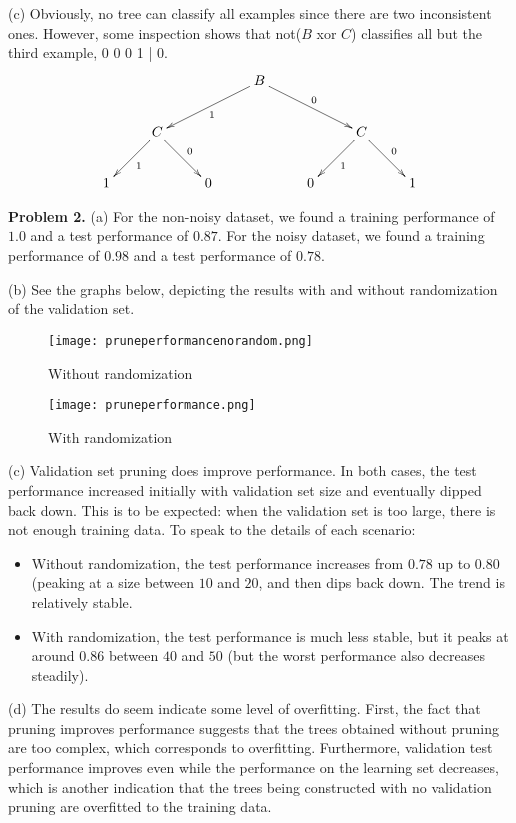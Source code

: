 \documentclass[12pt]{amsart}
\theoremstyle{remark}
\begin{document}
(c) Obviously, no tree can classify all examples since there are two inconsistent ones. However, some inspection shows that not($B$ xor $C$) classifies all but the third example, 0 0 0 1 | 0. 
\[
\xymatrix{
& & & \ar[dll]^1 \ar[drr]^0 B  & & & \\
& C \ar[dl]^1 \ar[dr]^0 & & & & C \ar[dl]^1 \ar[dr]^0 \\
1 & & 0 & & 0 &  & 1
}
\]

\newpage

\noindent \textbf{Problem 2.} (a) For the non-noisy dataset, we found a training performance of $1.0$ and a test performance of $0.87$. For the noisy dataset, we found a training performance of $0.98$ and a test performance of $0.78$. 

(b) See the graphs below, depicting the results with and without randomization of the validation set. 


\begin{figure}[!h]
\texttt{[image: pruneperformancenorandom.png]}
\caption{Without randomization}
\end{figure}

\begin{figure}[!h]
\texttt{[image: pruneperformance.png]}
\caption{With randomization}
\end{figure}



(c) Validation set pruning does improve performance. In both cases, the test performance increased initially with validation set size and eventually dipped back down. This is to be expected: when the validation set is too large, there is not enough training data. To speak to the details of each scenario:

\begin{itemize}
\item Without randomization, the test performance increases from $0.78$ up to $0.80$ (peaking at a size between $10$ and $20$, and then dips back down. The trend is relatively stable. 
\item With randomization, the test performance is much less stable, but it peaks at around $0.86$ between $40$ and $50$ (but the worst performance also decreases steadily). 
\end{itemize}

(d) The results do seem indicate some level of overfitting. First, the fact that pruning improves performance suggests that the trees obtained without pruning are too complex, which corresponds to overfitting. Furthermore, validation test performance improves even while the performance on the learning set decreases, which is another indication that the trees being constructed with no validation pruning are overfitted to the training data. 
\newpage
\end{document}
